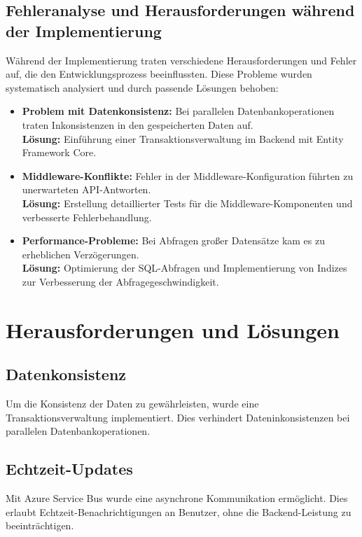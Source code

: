 \subsection{Fehleranalyse und Herausforderungen während der Implementierung}
Während der Implementierung traten verschiedene Herausforderungen und Fehler auf, die den Entwicklungsprozess beeinflussten. Diese Probleme wurden systematisch analysiert und durch passende Lösungen behoben:
\begin{itemize}
    \item \textbf{Problem mit Datenkonsistenz:} Bei parallelen Datenbankoperationen traten Inkonsistenzen in den gespeicherten Daten auf. \\
    \textbf{Lösung:} Einführung einer Transaktionsverwaltung im Backend mit Entity Framework Core.
    
    \item \textbf{Middleware-Konflikte:} Fehler in der Middleware-Konfiguration führten zu unerwarteten API-Antworten. \\
    \textbf{Lösung:} Erstellung detaillierter Tests für die Middleware-Komponenten und verbesserte Fehlerbehandlung.

    \item \textbf{Performance-Probleme:} Bei Abfragen großer Datensätze kam es zu erheblichen Verzögerungen. \\
    \textbf{Lösung:} Optimierung der SQL-Abfragen und Implementierung von Indizes zur Verbesserung der Abfragegeschwindigkeit.
\end{itemize}


\section{Herausforderungen und Lösungen}
\subsection{Datenkonsistenz}
Um die Konsistenz der Daten zu gewährleisten, wurde eine Transaktionsverwaltung implementiert. Dies verhindert Dateninkonsistenzen bei parallelen Datenbankoperationen.

\subsection{Echtzeit-Updates}
Mit Azure Service Bus wurde eine asynchrone Kommunikation ermöglicht. Dies erlaubt Echtzeit-Benachrichtigungen an Benutzer, ohne die Backend-Leistung zu beeinträchtigen.

